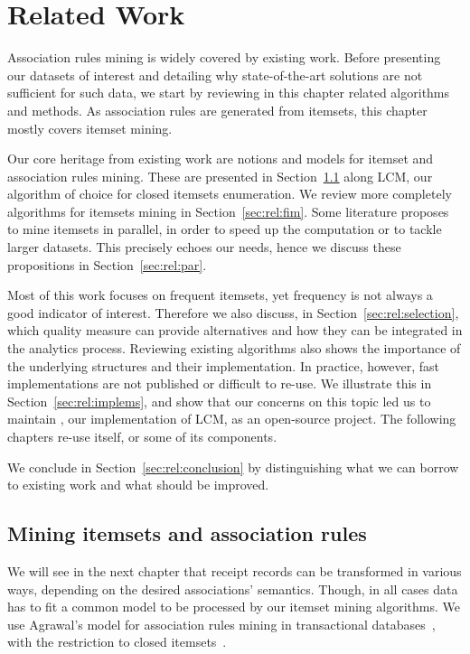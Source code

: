 \chapter{Related Work}
\label{chap:rel}

\minitoc

\vfill

Association rules mining is widely covered by existing work.
Before presenting our datasets of interest and
detailing why state-of-the-art solutions are not sufficient for such data,
we start by reviewing in this chapter related algorithms and methods.
As association rules are generated from itemsets,
this chapter mostly covers itemset mining.

Our core heritage from existing work are
notions and models for itemset and association rules mining.
These are presented in Section~\ref{sec:model} along LCM,
our algorithm of choice for closed itemsets enumeration.
We review more completely algorithms for itemsets mining in Section~\ref{sec:rel:fim}.
Some literature proposes to mine itemsets in parallel,
in order to speed up the computation or to tackle larger datasets.
This precisely echoes our needs, hence we discuss these propositions in Section~\ref{sec:rel:par}.

Most of this work focuses on frequent itemsets,
yet frequency is not always a good indicator of interest.
Therefore we also discuss, in Section~\ref{sec:rel:selection},
which quality measure can provide alternatives
and how they can be integrated in the analytics process.
Reviewing existing algorithms also shows the importance of the underlying structures and their implementation.
In practice, however, fast implementations are not published or difficult to re-use.
We illustrate this in Section~\ref{sec:rel:implems},
and show that our concerns on this topic led us to maintain \jlcm, our implementation of LCM,
as an open-source project.
The following chapters re-use \jlcm itself, or some of its components.

We conclude in Section~\ref{sec:rel:conclusion} by distinguishing
what we can borrow to existing work and what should be improved.


\pagebreak


\section{Mining itemsets and association rules}
\label{sec:model}

We will see in the next chapter that receipt records can be transformed in various ways,
depending on the desired associations' semantics.
Though, in all cases data has to fit a common model to be processed by our itemset mining algorithms.
We use Agrawal's model for association rules mining in transactional databases~\cite{AgrawalVLDB94},
with the restriction to closed itemsets~\cite{PasquierICDT99}.


